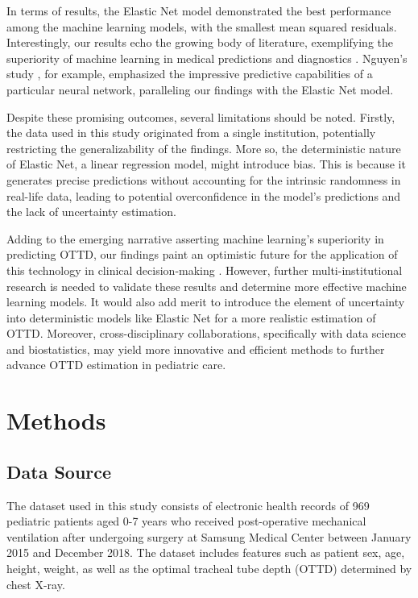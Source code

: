 \documentclass[11pt]{article}
\begin{document}
In terms of results, the Elastic Net model demonstrated the best performance among the machine learning models, with the smallest mean squared residuals. Interestingly, our results echo the growing body of literature, exemplifying the superiority of machine learning in medical predictions and diagnostics \cite{Yoo2021DeepLF, Nguyen2020OptimizationOA, Fang2020ImproveIH}. Nguyen's study \cite{Nguyen2020OptimizationOA}, for example, emphasized the impressive predictive capabilities of a particular neural network, paralleling our findings with the Elastic Net model. 

Despite these promising outcomes, several limitations should be noted. Firstly, the data used in this study originated from a single institution, potentially restricting the generalizability of the findings. More so, the deterministic nature of Elastic Net, a linear regression model, might introduce bias. This is because it generates precise predictions without accounting for the intrinsic randomness in real-life data, leading to potential overconfidence in the model's predictions and the lack of uncertainty estimation. 

Adding to the emerging narrative asserting machine learning's superiority in predicting OTTD, our findings paint an optimistic future for the application of this technology in clinical decision-making \cite{Yoo2021DeepLF, Bari2020MachinelearningRA}. However, further multi-institutional research is needed to validate these results and determine more effective machine learning models. It would also add merit to introduce the element of uncertainty into deterministic models like Elastic Net for a more realistic estimation of OTTD. Moreover, cross-disciplinary collaborations, specifically with data science and biostatistics, may yield more innovative and efficient methods to further advance OTTD estimation in pediatric care.

\section*{Methods}

\subsection*{Data Source}
The dataset used in this study consists of electronic health records of 969 pediatric patients aged 0-7 years who received post-operative mechanical ventilation after undergoing surgery at Samsung Medical Center between January 2015 and December 2018. The dataset includes features such as patient sex, age, height, weight, as well as the optimal tracheal tube depth (OTTD) determined by chest X-ray.
\end{document}
